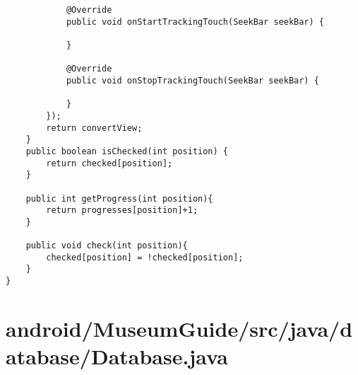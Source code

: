 \begin{lstlisting}
            @Override
            public void onStartTrackingTouch(SeekBar seekBar) {

            }

            @Override
            public void onStopTrackingTouch(SeekBar seekBar) {

            }
        });
        return convertView;
    }
    public boolean isChecked(int position) {
        return checked[position];
    }

    public int getProgress(int position){
        return progresses[position]+1;
    }

    public void check(int position){
        checked[position] = !checked[position];
    }
}
\end{lstlisting}
\newpage
\section{android/MuseumGuide/src/java/database/Database.java}
